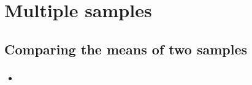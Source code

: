 \documentclass[t,notes=show]{beamer} %
\begin{document}
\section{Multiple samples}

\subsection{Comparing the means of two samples}

\begin{frame}
  \frametitle{}

  \begin{itemize}
  \item 
  \end{itemize}

\end{frame}

\begin{frame}[fragile]
  \frametitle{}

  \begin{alltt}
  \end{alltt}
\end{frame}

\subsection{}

\begin{frame}
  \frametitle{}

\end{frame}

\begin{frame}[fragile]
  \frametitle{}

  \begin{alltt}
  \end{alltt}
\end{frame}

\section{}

\subsection{}
\end{document}
